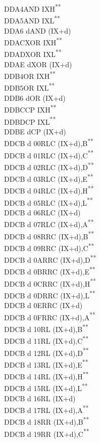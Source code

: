 \documentclass[12pt,twoside,openright,a4paper]{book}
\newcommand{\UNDOC}{\textnormal{\textsuperscript{**}}}
\begin{document}
\begin{multicols}{3}
{\begin{tabbing}
	DDA4\>AND IXH\UNDOC\\
	DDA5\>AND IXL\UNDOC\\
	DDA6 d\>AND (IX+d)\\
	DDAC\>XOR IXH\UNDOC\\
	DDAD\>XOR IXL\UNDOC\\
	DDAE d\>XOR (IX+d)\\
	DDB4\>OR IXH\UNDOC\\
	DDB5\>OR IXL\UNDOC\\
	DDB6 d\>OR (IX+d)\\
	DDBC\>CP IXH\UNDOC\\
	DDBD\>CP IXL\UNDOC\\
	DDBE d\>CP (IX+d)\\
	DDCB d 00\>RLC (IX+d),B\UNDOC\\
	DDCB d 01\>RLC (IX+d),C\UNDOC\\
	DDCB d 02\>RLC (IX+d),D\UNDOC\\
	DDCB d 03\>RLC (IX+d),E\UNDOC\\
	DDCB d 04\>RLC (IX+d),H\UNDOC\\
	DDCB d 05\>RLC (IX+d),L\UNDOC\\
	DDCB d 06\>RLC (IX+d)\\
	DDCB d 07\>RLC (IX+d),A\UNDOC\\
	DDCB d 08\>RRC (IX+d),B\UNDOC\\
	DDCB d 09\>RRC (IX+d),C\UNDOC\\
	DDCB d 0A\>RRC (IX+d),D\UNDOC\\
	DDCB d 0B\>RRC (IX+d),E\UNDOC\\
	DDCB d 0C\>RRC (IX+d),H\UNDOC\\
	DDCB d 0D\>RRC (IX+d),L\UNDOC\\
	DDCB d 0E\>RRC (IX+d)\\
	DDCB d 0F\>RRC (IX+d),A\UNDOC\\
	DDCB d 10\>RL (IX+d),B\UNDOC\\
	DDCB d 11\>RL (IX+d),C\UNDOC\\
	DDCB d 12\>RL (IX+d),D\UNDOC\\
	DDCB d 13\>RL (IX+d),E\UNDOC\\
	DDCB d 14\>RL (IX+d),H\UNDOC\\
	DDCB d 15\>RL (IX+d),L\UNDOC\\
	DDCB d 16\>RL (IX+d)\\
	DDCB d 17\>RL (IX+d),A\UNDOC\\
	DDCB d 18\>RR (IX+d),B\UNDOC\\
	DDCB d 19\>RR (IX+d),C\UNDOC\\

\end{tabbing}}
\end{multicols}
\end{document}
